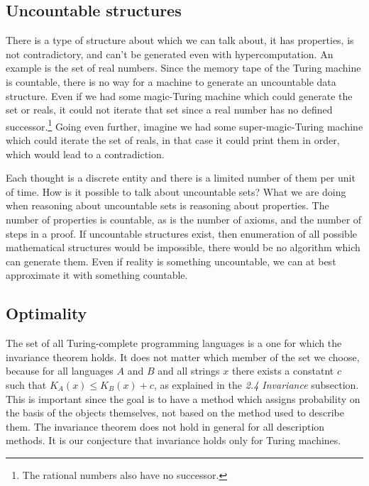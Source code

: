 \documentclass[oneside,hidelinks]{article}
\begin{document}
\newpage

\subsection{Uncountable structures}

There is a type of structure about which we can talk about, it has properties, is not contradictory, and can't be generated even with hypercomputation.
An example is the set of real numbers.
Since the memory tape of the Turing machine is countable, there is no way for a machine to generate an uncountable data structure.
Even if we had some magic-Turing machine which could generate the set or reals, it could not iterate that set since a real number has no defined successor.\footnote{The rational numbers also have no successor.}
Going even further, imagine we had some super-magic-Turing machine which could iterate the set of reals, in that case it could print them in order, which would lead to a contradiction.

Each thought is a discrete entity and there is a limited number of them per unit of time.
How is it possible to talk about uncountable sets?
What we are doing when reasoning about uncountable sets is reasoning about properties.
The number of properties is countable, as is the number of axioms, and the number of steps in a proof.
If uncountable structures exist, then enumeration of all possible mathematical structures would be impossible, there would be no algorithm which can generate them.
Even if reality is something uncountable, we can at best approximate it with something countable.

\newpage

\subsection{Optimality}

The set of all Turing-complete programming languages is a one for which the invariance theorem holds.
It does not matter which member of the set we choose, because for all languages $A$ and $B$ and all strings $x$ there exists a constatnt $c$ such that $K_A(x) \leq K_B(x) + c$, as explained in the \textit{2.4 Invariance} subsection.
This is important since the goal is to have a method which assigns probability on the basis of the objects themselves, not based on the method used to describe them.
The invariance theorem does not hold in general for all description methods.
It is our conjecture that invariance holds only for Turing machines.
\end{document}
